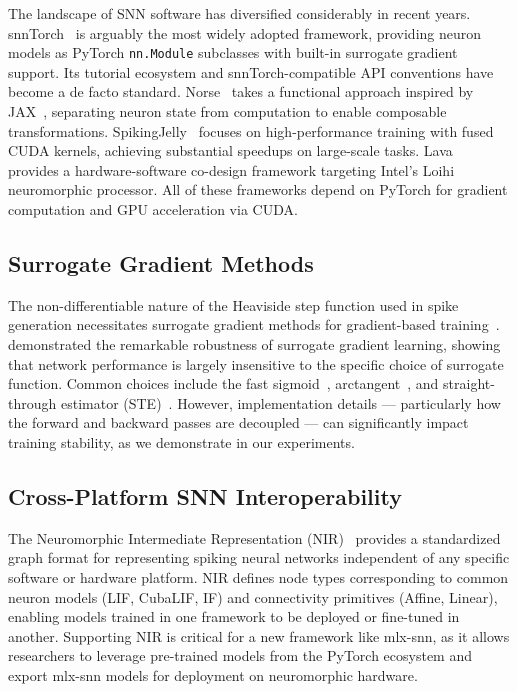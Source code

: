 \documentclass[11pt]{article}
\begin{document}
The landscape of SNN software has diversified considerably in recent years. snnTorch~\citep{eshraghian2023training} is arguably the most widely adopted framework, providing neuron models as PyTorch \texttt{nn.Module} subclasses with built-in surrogate gradient support. Its tutorial ecosystem and snnTorch-compatible API conventions have become a de facto standard. Norse~\citep{pehle2021norse} takes a functional approach inspired by JAX~\citep{jax2018}, separating neuron state from computation to enable composable transformations. SpikingJelly~\citep{fang2023spikingjelly} focuses on high-performance training with fused CUDA kernels, achieving substantial speedups on large-scale tasks. Lava~\citep{lava2021} provides a hardware-software co-design framework targeting Intel's Loihi neuromorphic processor. All of these frameworks depend on PyTorch for gradient computation and GPU acceleration via CUDA.

\subsection{Surrogate Gradient Methods}

The non-differentiable nature of the Heaviside step function used in spike generation necessitates surrogate gradient methods for gradient-based training~\citep{neftci2019surrogate}. \citet{zenke2021remarkable} demonstrated the remarkable robustness of surrogate gradient learning, showing that network performance is largely insensitive to the specific choice of surrogate function. Common choices include the fast sigmoid~\citep{zenke2021remarkable}, arctangent~\citep{shrestha2018slayer}, and straight-through estimator (STE)~\citep{bengio2013estimating}. However, implementation details --- particularly how the forward and backward passes are decoupled --- can significantly impact training stability, as we demonstrate in our experiments.

\subsection{Cross-Platform SNN Interoperability}

The Neuromorphic Intermediate Representation (NIR)~\citep{pedersen2024nir} provides a standardized graph format for representing spiking neural networks independent of any specific software or hardware platform. NIR defines node types corresponding to common neuron models (LIF, CubaLIF, IF) and connectivity primitives (Affine, Linear), enabling models trained in one framework to be deployed or fine-tuned in another. Supporting NIR is critical for a new framework like mlx-snn, as it allows researchers to leverage pre-trained models from the PyTorch ecosystem and export mlx-snn models for deployment on neuromorphic hardware.
\end{document}
